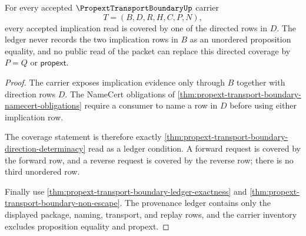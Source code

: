 \begin{theorem}
\label{thm:propext-transport-boundary-direction-ledger-coverage}
For every accepted $\PropextTransportBoundaryUp$ carrier
$$
T=(B,D,R,H,C,P,N),
$$
every accepted implication read is covered by one of the directed rows in $D$. The ledger never records the two implication rows in $B$ as an unordered proposition equality, and no public read of the packet can replace this directed coverage by $P=Q$ or $\mathsf{propext}$.
\end{theorem}
\begin{proof}
The carrier exposes implication evidence only through $B$ together with direction rows $D$. The NameCert obligations of \autoref{thm:propext-transport-boundary-namecert-obligations} require a consumer to name a row in $D$ before using either implication row.

The coverage statement is therefore exactly \autoref{thm:propext-transport-boundary-direction-determinacy} read as a ledger condition. A forward request is covered by the forward row, and a reverse request is covered by the reverse row; there is no third unordered row.

Finally use \autoref{thm:propext-transport-boundary-ledger-exactness} and \autoref{thm:propext-transport-boundary-non-escape}. The provenance ledger contains only the displayed package, naming, transport, and replay rows, and the carrier inventory excludes proposition equality and propext.
\end{proof}

